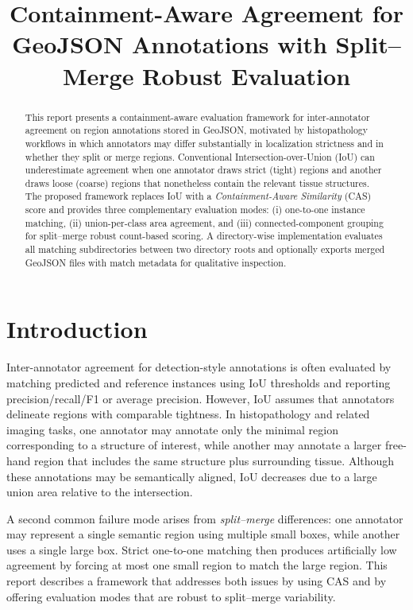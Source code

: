 \documentclass[11pt]{article}
\title{Containment-Aware Agreement for GeoJSON Annotations with Split--Merge Robust Evaluation}
\author{}
\date{}
\begin{document}
\maketitle

\begin{abstract}
This report presents a containment-aware evaluation framework for inter-annotator agreement on region annotations stored in GeoJSON, motivated by histopathology workflows in which annotators may differ substantially in localization strictness and in whether they split or merge regions.
Conventional Intersection-over-Union (IoU) can underestimate agreement when one annotator draws strict (tight) regions and another draws loose (coarse) regions that nonetheless contain the relevant tissue structures.
The proposed framework replaces IoU with a \emph{Containment-Aware Similarity} (CAS) score and provides three complementary evaluation modes: (i) one-to-one instance matching, (ii) union-per-class area agreement, and (iii) connected-component grouping for split--merge robust count-based scoring.
A directory-wise implementation evaluates all matching subdirectories between two directory roots and optionally exports merged GeoJSON files with match metadata for qualitative inspection.
\end{abstract}

\section{Introduction}
Inter-annotator agreement for detection-style annotations is often evaluated by matching predicted and reference instances using IoU thresholds and reporting precision/recall/F1 or average precision.
However, IoU assumes that annotators delineate regions with comparable tightness.
In histopathology and related imaging tasks, one annotator may annotate only the minimal region corresponding to a structure of interest, while another may annotate a larger free-hand region that includes the same structure plus surrounding tissue.
Although these annotations may be semantically aligned, IoU decreases due to a large union area relative to the intersection.

A second common failure mode arises from \emph{split--merge} differences: one annotator may represent a single semantic region using multiple small boxes, while another uses a single large box.
Strict one-to-one matching then produces artificially low agreement by forcing at most one small region to match the large region.
This report describes a framework that addresses both issues by using CAS and by offering evaluation modes that are robust to split--merge variability.
\end{document}
